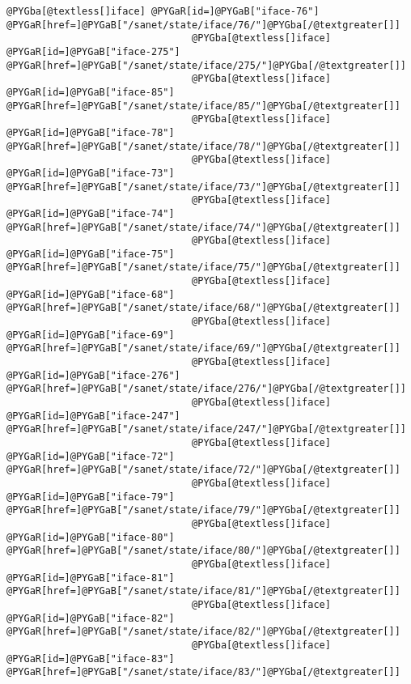 \documentclass[a4wide,10pt,italian]{manual}
\begin{document}
\begin{Verbatim}[commandchars=@\[\]]
                                @PYGba[@textless[]iface] @PYGaR[id=]@PYGaB["iface-76"] @PYGaR[href=]@PYGaB["/sanet/state/iface/76/"]@PYGba[/@textgreater[]]
                                @PYGba[@textless[]iface] @PYGaR[id=]@PYGaB["iface-275"] @PYGaR[href=]@PYGaB["/sanet/state/iface/275/"]@PYGba[/@textgreater[]]
                                @PYGba[@textless[]iface] @PYGaR[id=]@PYGaB["iface-85"] @PYGaR[href=]@PYGaB["/sanet/state/iface/85/"]@PYGba[/@textgreater[]]
                                @PYGba[@textless[]iface] @PYGaR[id=]@PYGaB["iface-78"] @PYGaR[href=]@PYGaB["/sanet/state/iface/78/"]@PYGba[/@textgreater[]]
                                @PYGba[@textless[]iface] @PYGaR[id=]@PYGaB["iface-73"] @PYGaR[href=]@PYGaB["/sanet/state/iface/73/"]@PYGba[/@textgreater[]]
                                @PYGba[@textless[]iface] @PYGaR[id=]@PYGaB["iface-74"] @PYGaR[href=]@PYGaB["/sanet/state/iface/74/"]@PYGba[/@textgreater[]]
                                @PYGba[@textless[]iface] @PYGaR[id=]@PYGaB["iface-75"] @PYGaR[href=]@PYGaB["/sanet/state/iface/75/"]@PYGba[/@textgreater[]]
                                @PYGba[@textless[]iface] @PYGaR[id=]@PYGaB["iface-68"] @PYGaR[href=]@PYGaB["/sanet/state/iface/68/"]@PYGba[/@textgreater[]]
                                @PYGba[@textless[]iface] @PYGaR[id=]@PYGaB["iface-69"] @PYGaR[href=]@PYGaB["/sanet/state/iface/69/"]@PYGba[/@textgreater[]]
                                @PYGba[@textless[]iface] @PYGaR[id=]@PYGaB["iface-276"] @PYGaR[href=]@PYGaB["/sanet/state/iface/276/"]@PYGba[/@textgreater[]]
                                @PYGba[@textless[]iface] @PYGaR[id=]@PYGaB["iface-247"] @PYGaR[href=]@PYGaB["/sanet/state/iface/247/"]@PYGba[/@textgreater[]]
                                @PYGba[@textless[]iface] @PYGaR[id=]@PYGaB["iface-72"] @PYGaR[href=]@PYGaB["/sanet/state/iface/72/"]@PYGba[/@textgreater[]]
                                @PYGba[@textless[]iface] @PYGaR[id=]@PYGaB["iface-79"] @PYGaR[href=]@PYGaB["/sanet/state/iface/79/"]@PYGba[/@textgreater[]]
                                @PYGba[@textless[]iface] @PYGaR[id=]@PYGaB["iface-80"] @PYGaR[href=]@PYGaB["/sanet/state/iface/80/"]@PYGba[/@textgreater[]]
                                @PYGba[@textless[]iface] @PYGaR[id=]@PYGaB["iface-81"] @PYGaR[href=]@PYGaB["/sanet/state/iface/81/"]@PYGba[/@textgreater[]]
                                @PYGba[@textless[]iface] @PYGaR[id=]@PYGaB["iface-82"] @PYGaR[href=]@PYGaB["/sanet/state/iface/82/"]@PYGba[/@textgreater[]]
                                @PYGba[@textless[]iface] @PYGaR[id=]@PYGaB["iface-83"] @PYGaR[href=]@PYGaB["/sanet/state/iface/83/"]@PYGba[/@textgreater[]]

\end{Verbatim}
\end{document}
